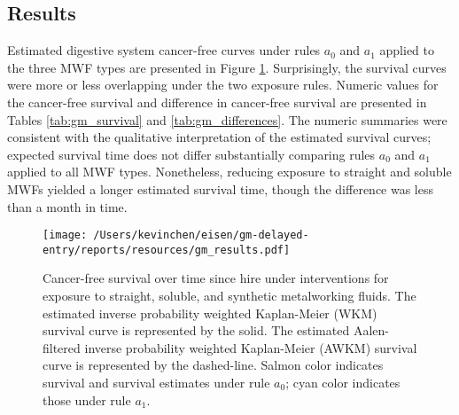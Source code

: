 \documentclass[
  11pt,
]{article}
\begin{document}
\hypertarget{results-1}{%
\subsection{Results}\label{results-1}}

Estimated digestive system cancer-free curves under rules \(a_0\) and
\(a_1\) applied to the three MWF types are presented in Figure
\ref{fig:gm_survival}. Surprisingly, the survival curves were more or
less overlapping under the two exposure rules. Numeric values for the
cancer-free survival and difference in cancer-free survival are
presented in Tables \ref{tab:gm_survival} and \ref{tab:gm_differences}.
The numeric summaries were consistent with the qualitative
interpretation of the estimated survival curves; expected survival time
does not differ substantially comparing rules \(a_0\) and \(a_1\)
applied to all MWF types. Nonetheless, reducing exposure to straight and
soluble MWFs yielded a longer estimated survival time, though the
difference was less than a month in time.

\begin{figure}[h]
\caption{Cancer-free survival over time since hire under interventions for exposure to straight, soluble, and synthetic metalworking fluids. The estimated inverse probability weighted Kaplan-Meier (WKM) survival curve is represented by the solid. The estimated Aalen-filtered inverse probability weighted Kaplan-Meier (AWKM) survival curve is represented by the dashed-line. Salmon color indicates survival and survival estimates under rule $a_0$; cyan color indicates those under rule $a_1$.}
\label{fig:gm_survival}
\begin{center}
\texttt{[image: /Users/kevinchen/eisen/gm-delayed-entry/reports/resources/gm\_results.pdf]}
\end{center}
\end{figure}
\end{document}
